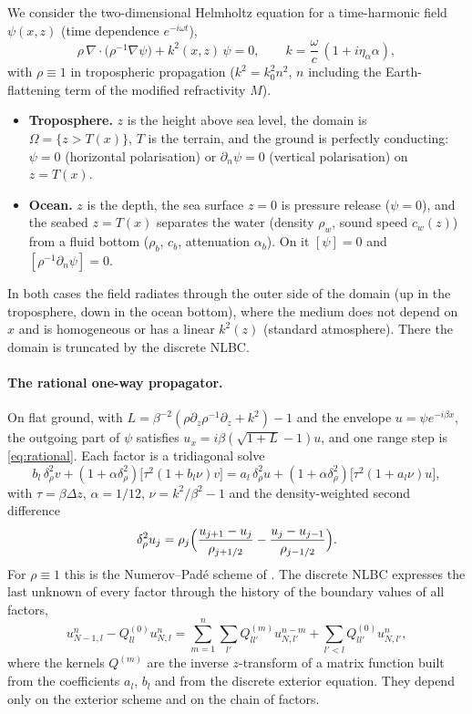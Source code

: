 \documentclass[11pt,a4paper]{article}
\theoremstyle{remark}
\newcommand{\het}{\nu}
\newcommand{\pd}{\partial}
\begin{document}
We consider the two-dimensional Helmholtz equation for a time-harmonic field
$\psi(x,z)$ (time dependence $e^{-i\omega t}$),
\begin{equation}\label{eq:helmholtz}
\rho\,\nabla\cdot\bigl(\rho^{-1}\nabla\psi\bigr)+k^2(x,z)\,\psi=0,\qquad k=\frac{\omega}{c}\,(1+i\eta_\alpha\alpha),
\end{equation}
with $\rho\equiv1$ in tropospheric propagation ($k^2=k_0^2n^2$, $n$ including
the Earth-flattening term of the modified refractivity $M$).
\begin{itemize}
\item \textbf{Troposphere.} $z$ is the height above sea level, the domain is
$\Omega=\{z>T(x)\}$, $T$ is the terrain, and the ground is perfectly conducting:
$\psi=0$ (horizontal polarisation) or $\pd_n\psi=0$ (vertical polarisation) on
$z=T(x)$.
\item \textbf{Ocean.} $z$ is the depth, the sea surface $z=0$ is pressure
release ($\psi=0$), and the seabed $z=T(x)$ separates the water (density
$\rho_w$, sound speed $c_w(z)$) from a fluid bottom ($\rho_b$, $c_b$,
attenuation $\alpha_b$). On it $[\psi]=0$ and $[\rho^{-1}\pd_n\psi]=0$.
\end{itemize}
In both cases the field radiates through the outer side of the domain (up in
the troposphere, down in the ocean bottom), where the medium does not depend on
$x$ and is homogeneous or has a linear $k^2(z)$ (standard atmosphere). There
the domain is truncated by the discrete NLBC.

\paragraph{The rational one-way propagator.}
On flat ground, with $L=\beta^{-2}(\rho\pd_z\rho^{-1}\pd_z+k^2)-1$ and the
envelope $u=\psi e^{-i\beta x}$, the outgoing part of $\psi$ satisfies
$u_x=i\beta(\sqrt{1+L}-1)u$, and one range step is \eqref{eq:rational}.
Each factor is a tridiagonal solve
\begin{equation}\label{eq:substep_flat}
b_l\,\delta^2_\rho v+(1+\alpha\delta_\rho^2)\bigl[\tau^2(1+b_l\het)v\bigr]=
a_l\,\delta^2_\rho u+(1+\alpha\delta_\rho^2)\bigl[\tau^2(1+a_l\het)u\bigr],
\end{equation}
with $\tau=\beta\Delta z$, $\alpha=1/12$, $\het=k^2/\beta^2-1$ and the
density-weighted second difference
\[
\delta^2_\rho u_j=\rho_j\Bigl(\frac{u_{j+1}-u_j}{\rho_{j+1/2}}-\frac{u_j-u_{j-1}}{\rho_{j-1/2}}\Bigr).
\]
For $\rho\equiv1$ this is the Numerov--Pad\'e scheme of \cite{lytaev2020awpl}.
The discrete NLBC \cite{lytaev2018awpl} expresses the last unknown of every
factor through the history of the boundary values of all factors,
\begin{equation}\label{eq:nlbc}
u^{n}_{N-1,l}-Q^{(0)}_{ll}u^{n}_{N,l}=\sum_{m=1}^{n}\sum_{l'}Q^{(m)}_{ll'}u^{n-m}_{N,l'}+\sum_{l'<l}Q^{(0)}_{ll'}u^n_{N,l'},
\end{equation}
where the kernels $Q^{(m)}$ are the inverse $z$-transform of a matrix function
built from the coefficients $a_l$, $b_l$ and from the discrete exterior
equation. They depend only on the exterior scheme and on the chain of factors.
\end{document}
